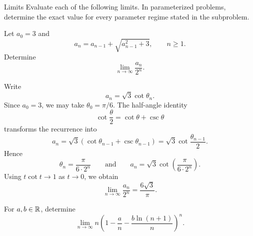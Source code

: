     \begin{expectedproblemgroup}{Limits}
        Evaluate each of the following limits. In parameterized problems,
        determine the exact value for every parameter regime stated in the
        subproblem.

        \begin{expectedsubproblem}
            Let $a_0=3$ and
            \[
                a_n=a_{n-1}+\sqrt{a_{n-1}^2+3},
                \qquad n\geq1.
            \]
            Determine
            \[
                \lim\limits_{n\to\infty}\frac{a_n}{2^n}.
            \]
        \end{expectedsubproblem}

        \begin{expectedsubsolution}
            Write
            \[
                a_n=\sqrt3\cot\theta_n.
            \]
            Since $a_0=3$, we may take $\theta_0=\pi/6$. The half-angle identity
            \[
                \cot\frac{\theta}{2}=\cot\theta+\csc\theta
            \]
            transforms the recurrence into
            \[
                a_n
                =
                \sqrt3\left(\cot\theta_{n-1}+\csc\theta_{n-1}\right)
                =
                \sqrt3\cot\frac{\theta_{n-1}}{2}.
            \]
            Hence
            \[
                \theta_n=\frac{\pi}{6\cdot2^n}
                \qquad\text{and}\qquad
                a_n=\sqrt3\cot\left(\frac{\pi}{6\cdot2^n}\right).
            \]
            Using $t\cot t\to1$ as $t\to0$, we obtain
            \[
                \boxed{
                    \lim\limits_{n\to\infty}\frac{a_n}{2^n}
                    =
                    \frac{6\sqrt3}{\pi}
                }.
            \]
        \end{expectedsubsolution}

        \begin{expectedsubproblem}
            For $a,b\in\mathbb{R}$, determine
            \[
                \lim\limits_{n\to\infty}
                n\left(
                    1-\frac{a}{n}-\frac{b\ln(n+1)}{n}
                \right)^n.
            \]
        \end{expectedsubproblem}


\end{expectedproblemgroup}
